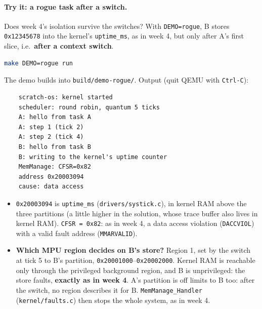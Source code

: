 \paragraph{Try it: a rogue task after a switch.} Does week 4's isolation survive the switches? With \texttt{DEMO=rogue}, B stores \texttt{0x12345678} into the kernel's \texttt{uptime\_ms}, as in week 4, but only after A's first slice, i.e.\ \textbf{after a context switch}.
\begin{lstlisting}[language=bash]
    make DEMO=rogue run
\end{lstlisting}
The demo builds into \texttt{build/demo-rogue/}. Output (quit QEMU with \texttt{Ctrl-C}):
\begin{verbatim}
    scratch-os: kernel started
    scheduler: round robin, quantum 5 ticks
    A: hello from task A
    A: step 1 (tick 2)
    A: step 2 (tick 4)
    B: hello from task B
    B: writing to the kernel's uptime counter
    MemManage: CFSR=0x82
    address 0x20003094
    cause: data access
\end{verbatim}
\begin{itemize}
    \item \texttt{0x20003094} is \texttt{uptime\_ms} (\texttt{drivers/systick.c}), in kernel RAM above the three partitions (a little higher in the solution, whose trace buffer also lives in kernel RAM). \texttt{CFSR = 0x82}: as in week 4, a data access violation (\texttt{DACCVIOL}) with a valid fault address (\texttt{MMARVALID}).
    \item \textbf{Which MPU region decides on B's store?} Region 1, set by the switch at tick 5 to B's partition, \texttt{0x20001000}--\texttt{0x20002000}. Kernel RAM is reachable only through the privileged background region, and B is unprivileged: the store faults, \textbf{exactly as in week 4}. A's partition is off limits to B too: after the switch, no region describes it for B. \texttt{MemManage\_Handler} (\texttt{kernel/faults.c}) then stops the whole system, as in week 4.
\end{itemize}

